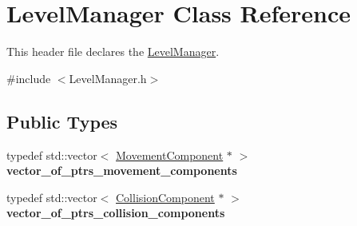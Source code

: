 \hypertarget{class_level_manager}{}\section{Level\+Manager Class Reference}
\label{class_level_manager}


This header file declares the \hyperlink{class_level_manager}{Level\+Manager}.  




{\ttfamily \#include $<$Level\+Manager.\+h$>$}

\subsection*{Public Types}
\begin{DoxyCompactItemize}
\item 
\hypertarget{class_level_manager_aeb43724114a2a794bf3421a8628d4d32}{}typedef std\+::vector$<$ \hyperlink{class_movement_component}{Movement\+Component} $\ast$ $>$ {\bfseries vector\+\_\+of\+\_\+ptrs\+\_\+movement\+\_\+components}\label{class_level_manager_aeb43724114a2a794bf3421a8628d4d32}

\item 
\hypertarget{class_level_manager_aef4b6c259dec0a9db7c4ec9b48011f12}{}typedef std\+::vector$<$ \hyperlink{class_collision_component}{Collision\+Component} $\ast$ $>$ {\bfseries vector\+\_\+of\+\_\+ptrs\+\_\+collision\+\_\+components}\label{class_level_manager_aef4b6c259dec0a9db7c4ec9b48011f12}

\end{DoxyCompactItemize}

